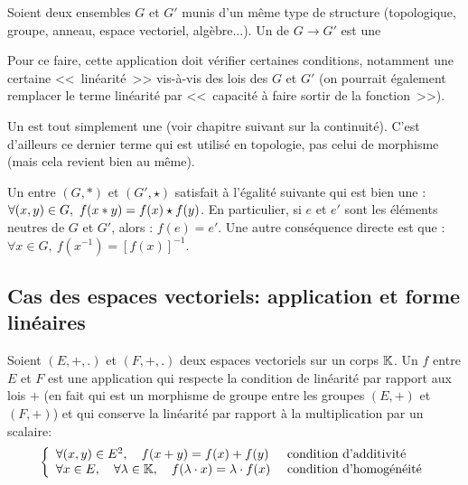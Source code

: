 \medskip
Soient deux ensembles $G$ et $G'$ munis d'un même type de
structure (topologique, groupe,
anneau, espace vectoriel, algèbre...).
Un  de $G \to G'$ est une

Pour ce faire, cette application doit vérifier certaines conditions, notamment une
certaine <<~linéarité~>> vis-à-vis des lois des $G$ et $G'$
(on pourrait également remplacer le terme linéarité par <<~capacité à faire
sortir de la fonction~>>).

\medskip
Un  est tout simplement
une  (voir chapitre suivant sur la continuité).
C'est d'ailleurs ce dernier terme qui est utilisé en topologie, pas celui de morphisme (mais cela
revient bien au même).

\medskip
Un  entre $(G,*)$ et $(G',\star)$ satisfait à l'égalité suivante
qui est bien une  :
$\colorred
\forall (x,y)\in G,\ f(x*y)=f(x)\star f(y)
$.
En particulier, si $e$ et $e'$ sont les éléments neutres de $G$ et $G'$, alors : $f(e)=e'$.
Une autre conséquence directe est que : $\forall x \in G,\ f(x^{-1})=[f(x)]^{-1}$.

\medskip
\subsection{Cas des espaces vectoriels: application et forme linéaires}

\begin{definition}[Morphisme d'ev]
Soient $(E,+,.)$ et $(F,+,.)$ deux espaces vectoriels sur un corps $\mathbb K$.
Un  $f$ entre $E$ et $F$ est une application qui respecte la condition
de linéarité par rapport aux lois $+$ (en fait qui est un morphisme
de groupe entre les groupes $(E,+)$ et $(F,+)$) et qui conserve la
\og linéarité par rapport à la multiplication par un scalaire\fg{}:
\begin{equation}\left\{
\begin{array}{ll}
\forall (x,y)\in E^2, \quad f(x+ y)=f(x)+ f(y) &\text{ condition d'additivité}\\
\forall x\in E,\quad \forall \lambda\in\mathbb K,\quad f(\lambda\cdot x)=\lambda\cdot f(x) &\text{ condition d'homogénéité}
\end{array}
\right.\end{equation}
\end{definition}

